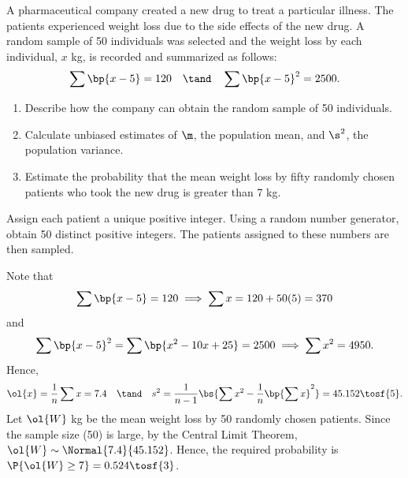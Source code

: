 \begin{problem}
    A pharmaceutical company created a new drug to treat a particular illness. The patients experienced weight loss due to the side effects of the new drug. A random sample of 50 individuals was selected and the weight loss by each individual, $x$ kg, is recorded and summarized as follows: \[\sum \bp{x - 5} = 120 \quad \tand \quad \sum \bp{x - 5}^2 = 2500.\]

    \begin{enumerate}
        \item Describe how the company can obtain the random sample of 50 individuals.
        \item Calculate unbiased estimates of $\m$, the population mean, and $\s^2$, the population variance.
        \item Estimate the probability that the mean weight loss by fifty randomly chosen patients who took the new drug is greater than 7 kg.
    \end{enumerate}
\end{problem}
\begin{solution}
    \begin{ppart}
        Assign each patient a unique positive integer. Using a random number generator, obtain 50 distinct positive integers. The patients assigned to these numbers are then sampled.
    \end{ppart}
    \begin{ppart}
        Note that \[\sum \bp{x - 5} = 120 \implies \sum x = 120 + 50(5) = 370\] and \[\sum \bp{x - 5}^2 = \sum \bp{x^2 - 10x + 25} = 2500 \implies \sum x^2 = 4950.\] Hence, \[\ol{x} = \frac1n \sum x = 7.4 \quad \tand \quad s^2 = \frac1{n-1} \bs{\sum x^2 - \frac1n \bp{\sum x}^2} = 45.152 \tosf{5}.\] Let $\ol{W}$ kg be the mean weight loss by 50 randomly chosen patients. Since the sample size (50) is large, by the Central Limit Theorem, $\ol{W} \sim \Normal{7.4}{45.152}$. Hence, the required probability is $\P{\ol{W} \geq 7} = 0.524 \tosf{3}$.
    \end{ppart}
\end{solution}